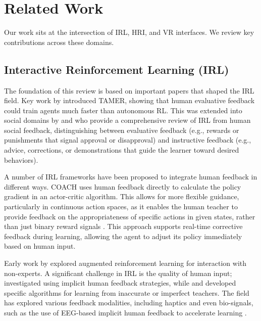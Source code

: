 \documentclass[../report.tex]{subfiles}
\begin{document}
    \section{Related Work}
    \label{sec:related_work}

    Our work sits at the intersection of IRL, HRI, and VR interfaces. We review key contributions across these domains.

    \subsection{Interactive Reinforcement Learning (IRL)}
    The foundation of this review is based on important papers that shaped the IRL field. Key work by \citet{BradleyKnox2008} introduced TAMER, showing that human evaluative feedback could train agents much faster than autonomous RL. This was extended into social domains by \citet{Lin2020a} and \citet{Lin2020} who provide a comprehensive review of IRL from human social feedback, distinguishing between evaluative feedback (e.g., rewards or punishments that signal approval or disapproval) and instructive feedback (e.g., advice, corrections, or demonstrations that guide the learner toward desired behaviors).

    A number of IRL frameworks have been proposed to integrate human feedback in different ways. COACH uses human feedback directly to calculate the policy gradient in an actor-critic algorithm. This allows for more flexible guidance, particularly in continuous action spaces, as it enables the human teacher to provide feedback on the appropriateness of specific actions in given states, rather than just binary reward signals \citep{Lin2020}. This approach supports real-time corrective feedback during learning, allowing the agent to adjust its policy immediately based on human input.

    Early work by \citet{6147010} explored augmented reinforcement learning for interaction with non-experts. A significant challenge in IRL is the quality of human input; \citet{Loftin2014} investigated using implicit human feedback strategies, while \citet{Faulkner2020} and \citet{KesslerFaulkner2021} developed specific algorithms for learning from inaccurate or imperfect teachers. The field has explored various feedback modalities, including haptics \citep{10490256} and even bio-signals, such as the use of EEG-based implicit human feedback to accelerate learning \citep{Xu2021}.
\end{document}
